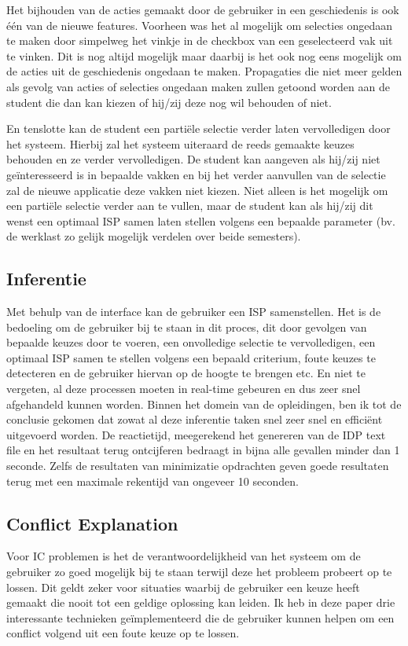 Het bijhouden van de acties gemaakt door de gebruiker in een geschiedenis is ook \'{e}\'{e}n van de nieuwe features. Voorheen was het al mogelijk om selecties ongedaan te maken door simpelweg het vinkje in de checkbox van een geselecteerd vak uit te vinken. Dit is nog altijd mogelijk maar daarbij is het ook nog eens mogelijk om de acties uit de geschiedenis ongedaan te maken. Propagaties die niet meer gelden als gevolg van acties of selecties ongedaan maken zullen getoond worden aan de student die dan kan kiezen of hij/zij deze nog wil behouden of niet. 

En tenslotte kan de student een parti\"{e}le selectie verder laten vervolledigen door het systeem. Hierbij zal het systeem uiteraard de reeds gemaakte keuzes behouden en ze verder vervolledigen. De student kan aangeven als hij/zij niet ge\"{i}nteresseerd is in bepaalde vakken en bij het verder aanvullen van de selectie zal de nieuwe applicatie deze vakken niet kiezen. Niet alleen is het mogelijk om een parti\"{e}le selectie verder aan te vullen, maar de student kan als hij/zij dit wenst een optimaal ISP samen laten stellen volgens een bepaalde parameter (bv. de werklast zo gelijk mogelijk verdelen over beide semesters). 

\subsection{Inferentie} 
Met behulp van de interface kan de gebruiker een ISP samenstellen. Het is de bedoeling om de gebruiker bij te staan in dit proces, dit door gevolgen van bepaalde keuzes door te voeren, een onvolledige selectie te vervolledigen, een optimaal ISP samen te stellen volgens een bepaald criterium, foute keuzes te detecteren en de gebruiker hiervan op de hoogte te brengen etc. En niet te vergeten, al deze processen moeten in real-time gebeuren en dus zeer snel afgehandeld kunnen worden. Binnen het domein van de opleidingen, ben ik tot de conclusie gekomen dat zowat al deze inferentie taken snel zeer snel en effici\"{e}nt uitgevoerd worden. De reactietijd, meegerekend het genereren van de IDP text file en het resultaat terug ontcijferen bedraagt in bijna alle gevallen minder dan 1 seconde. Zelfs de resultaten van minimizatie opdrachten geven goede resultaten terug met een maximale rekentijd van ongeveer 10 seconden. 

\subsection{Conflict Explanation} 
Voor IC problemen is het de verantwoordelijkheid van het systeem om de gebruiker zo goed mogelijk bij te staan terwijl deze het probleem probeert op te lossen. Dit geldt zeker voor situaties waarbij de gebruiker een keuze heeft gemaakt die nooit tot een geldige oplossing kan leiden. Ik heb in deze paper drie interessante technieken ge\"{i}mplementeerd die de gebruiker kunnen helpen om een conflict volgend uit een foute keuze op te lossen.

